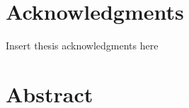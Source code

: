 
\chapter*{Acknowledgments}

{\color{red}%
Insert thesis acknowledgments here}

\lipsum[1-2]

\clearpage


\chapter*{Abstract}

{\color{red}}

\lipsum[1-6]

\clearpage


\tableofcontents


\clearpage

